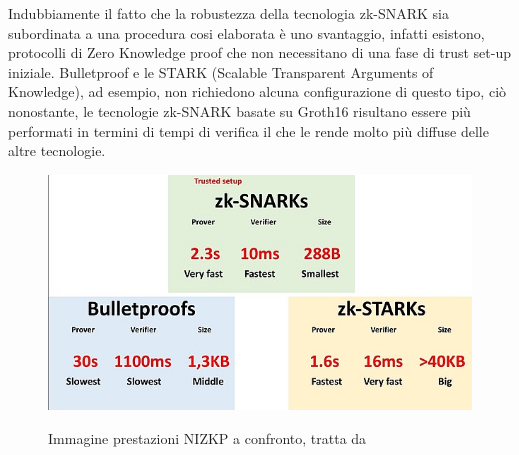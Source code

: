 Indubbiamente il fatto che la robustezza della tecnologia zk-SNARK sia subordinata a una procedura cosi elaborata è uno
svantaggio, infatti esistono, protocolli di Zero Knowledge proof che non necessitano di una fase di trust set-up
iniziale. Bulletproof e le STARK (Scalable Transparent Arguments of Knowledge), ad esempio, non richiedono alcuna
configurazione di questo tipo, ciò nonostante, le tecnologie  zk-SNARK basate su Groth16 risultano essere più performati in termini di
tempi di verifica il che le rende molto più diffuse delle altre tecnologie.
\begin{figure}[H]
    \centering
    \includegraphics[width=13cm]{./chapters/1.state-of-art/images/14.diff_zk.png}
    \label{fig:different_zk}
    \captionsetup{justification=centering}
    \caption{Immagine prestazioni NIZKP a confronto, tratta da \cite{non_interactive_zero_knowledge_proof}}
\end{figure}
